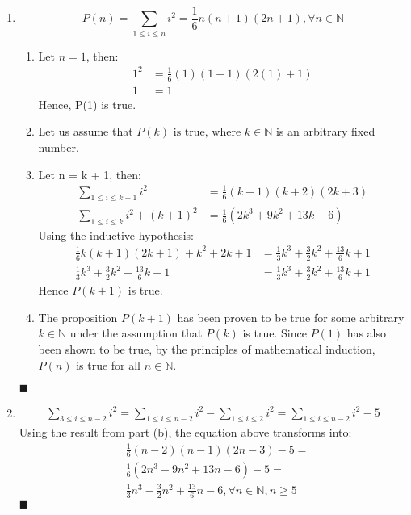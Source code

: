 \documentclass[12pt]{article}
\newcommand{\p}[1]{\item[\textnormal{(#1)}]}
\newcommand{\q}{\hfill $\blacksquare$}
\newenvironment{ps}
{\begin{enumerate}[leftmargin=0em, itemindent=1.5em]}
{\end{enumerate}}
\begin{document}
\begin{ps}
\begin{enumerate}[label=\arabic*.]
    \end{enumerate} \q

    \p{b} \[ P(n) = \sum_{1 \leq i \leq n} i^2 = \frac{1}{6}n(n+1)(2n+1), \forall n \in
    \mathbb{N} \]

    \begin{enumerate}[label=\arabic*.]
        \item Let \( n = 1 \), then: 
        \begin{align*}
            1^2 &= \frac{1}{6}(1)(1+1)(2(1) + 1) \\
            1 &= 1
        \end{align*}
        Hence, P(1) is true.

    \item Let us assume that \( P(k) \text{ is true, where } k \in \mathbb{N} \) is an arbitrary
        fixed number.

    \item Let n = k + 1, then:
    \begin{align*}
        \sum_{1 \leq i \leq k+1} i^2 &= \frac{1}{6}(k+1)(k+2)(2k+3) \\
        \sum_{1 \leq i \leq k} i^2 + (k+1)^2 &= \frac{1}{6}(2k^3 + 9k^2 + 13k + 6)
    \end{align*}
    Using the inductive hypothesis:
    \begin{align*}
        \frac{1}{6}k(k+1)(2k+1) + k^2 + 2k + 1 &= \frac{1}{3}k^3 + \frac{3}{2}k^2 + \frac{13}{6}k + 1 \\
         \frac{1}{3}k^3 + \frac{3}{2}k^2 + \frac{13}{6}k + 1 &= \frac{1}{3}k^3 + \frac{3}{2}k^2 + \frac{13}{6}k + 1
    \end{align*}
    Hence \( P(k+1) \) is true.

    \item The proposition \( P(k+1) \) has been proven to be true for some arbitrary \( k \in
        \mathbb{N} \) under the assumption that \( P(k) \) is true. Since \( P(1) \) has also been
        shown to be true, by the principles of mathematical induction, \( P(n) \) is true for all \( n \in
        \mathbb{N} \).

    \end{enumerate} \q
    
    \p{c}
    \begin{align*}
        \sum_{3 \leq i \leq n-2} i^2 =
        \sum_{1 \leq i \leq n-2} i^2 - \sum_{1 \leq i \leq 2} i^2 =
        \sum_{1 \leq i \leq n-2} i^2 - 5
    \end{align*}
    Using the result from part (b), the equation above transforms into:
    \begin{align*}
        &\frac{1}{6}(n-2)(n-1)(2n-3) - 5 = \\
        &\frac{1}{6}(2n^3 - 9n^2 + 13n - 6) - 5 = \\
        &\frac{1}{3}n^3 - \frac{3}{2}n^2 + \frac{13}{6}n - 6, \forall n \in \mathbb{N}, n \geq 5
    \end{align*} \q


\end{ps}
\end{document}
